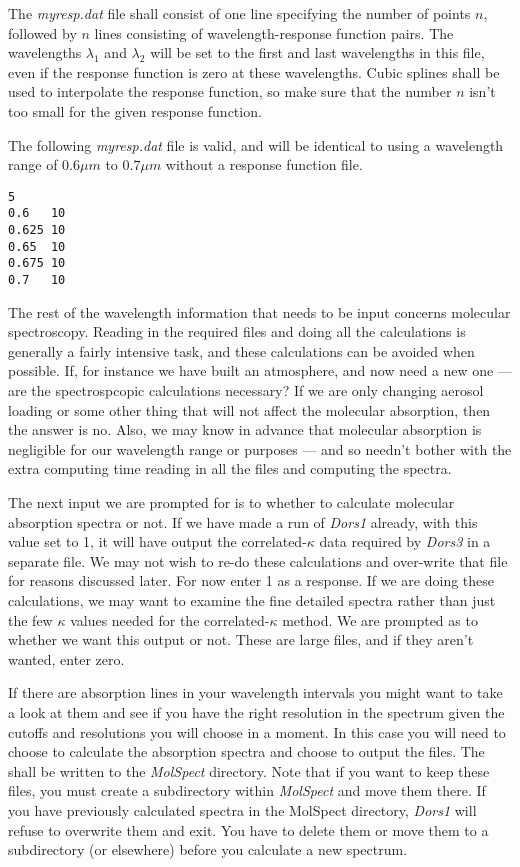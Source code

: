 \documentclass[12pt]{article}
\begin{document}
 The {\it myresp.dat}  file  shall
consist of one line specifying the number of points $n$,
 followed by $n$ lines consisting
of wavelength-response function pairs. The wavelengths $\lambda_1$ and $\lambda_2$ will be
 set to the first and last wavelengths in this file, even if the
 response function is zero at these wavelengths.
Cubic splines shall be used to interpolate the response function, so make sure that the number $n$ isn't
too small for the given response function.

The following {\it myresp.dat} file is valid, and will be identical to using a wavelength 
range of $0.6\mu m$ to $0.7 \mu m$ without a response function file. 

\begin{verbatim}
5
0.6   10
0.625 10
0.65  10
0.675 10
0.7   10
\end{verbatim}

The rest of the wavelength information that needs to be input concerns molecular spectroscopy. Reading
in the required files and doing all the calculations 
is generally a fairly intensive task, and these calculations can be avoided when possible. If, for instance
we have built an atmosphere, and now need a new one  --- are the spectrospcopic calculations necessary?
If we are only changing aerosol loading or some other thing that will not affect
the molecular absorption, then the answer is no. Also, we may know in advance that molecular absorption is negligible
 for our wavelength range or purposes --- and so needn't bother with the extra computing time reading in all the files and computing the spectra.


The next input we are prompted for is to whether to calculate molecular absorption spectra or not.
If we have made a run of {\it Dors1} already, with this value set to 1, it will have output the
correlated-$\kappa$ data required by {\it Dors3} in a separate file. 
We may not wish to re-do these calculations and over-write that file for reasons discussed later.
For now enter 1 as a response. If we are doing these calculations, we may want to examine the fine
detailed spectra rather than just the few $\kappa$ values needed for the correlated-$\kappa$ method.
We are prompted as to whether we want this output or not. These are large files, and if they aren't wanted, enter zero.

If there are absorption lines in your wavelength intervals you might want to take a look at them and see
if you have the right resolution in the spectrum given the cutoffs and resolutions you will choose in a moment.
In this case you will need to choose to calculate the absorption spectra and choose to output the files.
The shall be written to the {\it MolSpect} directory. Note that if you want to keep these files, you must create
a subdirectory within {\it MolSpect} and move them there. If you have previously calculated spectra in the 
{MolSpect} directory, {\it Dors1} will refuse to overwrite them and exit. You have to delete them
 or move them to a subdirectory (or elsewhere) before you calculate a new spectrum.
\end{document}
